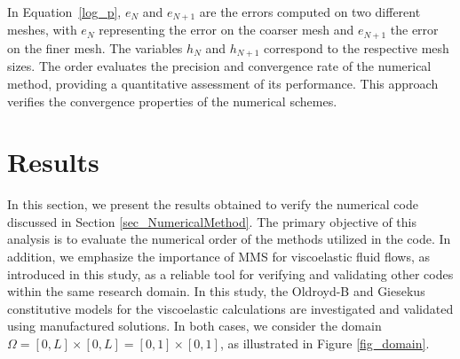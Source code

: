 \documentclass[preprint, 12pt]{elsarticle}
\begin{document}
In Equation~\eqref{log_p}, $e_{N}$ and $e_{N+1}$ are the errors computed on two different meshes, with $e_{N}$ representing the error on the coarser mesh and $e_{N+1}$ the error on the finer mesh. The variables $h_{N}$ and $h_{N+1}$ correspond to the respective mesh sizes. The order evaluates the precision and convergence rate of the numerical method, providing a quantitative assessment of its performance. This approach verifies the convergence properties of the numerical schemes.

\section{Results}\label{sec_Results}

In this section, we present the results obtained to verify the numerical code discussed in Section \ref{sec_NumericalMethod}. The primary objective of this analysis is to evaluate the numerical order of the methods utilized in the code. In addition, we emphasize the importance of MMS for viscoelastic fluid flows, as introduced in this study, as a reliable tool for verifying and validating other codes within the same research domain. In this study, the Oldroyd-B and Giesekus constitutive models for the viscoelastic calculations are investigated and validated using manufactured solutions. In both cases, we consider the domain $\Omega = [0,L]\times[0,L] = [0,1]\times[0,1]$, as illustrated in Figure \ref{fig_domain}.
\end{document}
